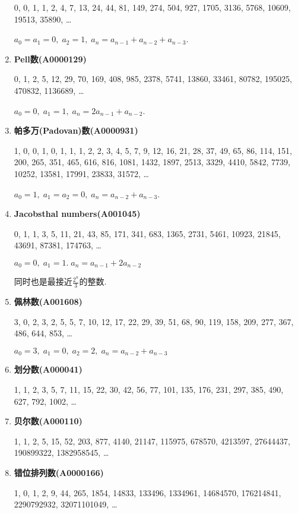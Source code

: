 \begin{enumerate}
0, 0, 1, 1, 2, 4, 7, 13, 24, 44, 81, 149, 274, 504, 927, 1705, 3136, 5768, 10609, 19513, 35890, \dots

$ a_0 = a_1 = 0,\; a_2 = 1,\; a_n = a_{n - 1} + a_{n - 2} + a_{n - 3} $.

\item \textbf{Pell数(A0000129)}

0, 1, 2, 5, 12, 29, 70, 169, 408, 985, 2378, 5741, 13860, 33461, 80782, 195025, 470832, 1136689, \dots

$ a_0 = 0,\; a_1 = 1,\; a_n = 2a_{n - 1} + a_{n - 2} $.

\item \textbf{帕多万(Padovan)数(A0000931)}

1, 0, 0, 1, 0, 1, 1, 1, 2, 2, 3, 4, 5, 7, 9, 12, 16, 21, 28, 37, 49, 65, 86, 114, 151, 200, 265, 351, 465, 616, 816, 1081, 1432, 1897, 2513, 3329, 4410, 5842, 7739, 10252, 13581, 17991, 23833, 31572, \dots

$a_0 = 1,\; a_1 = a_2 = 0,\; a_n = a_{n - 2} + a_{n - 3}$.

\item \textbf{Jacobsthal numbers(A001045)}

0, 1, 1, 3, 5, 11, 21, 43, 85, 171, 341, 683, 1365, 2731, 5461, 10923, 21845, 43691, 87381, 174763, \dots

$ a_0 = 0,\; a_1 = 1.\; a_n = a_{n - 1} + 2a_{n - 2} $

同时也是最接近$\frac {2 ^ n} 3$的整数.

\item \textbf{佩林数(A001608)}

3, 0, 2, 3, 2, 5, 5, 7, 10, 12, 17, 22, 29, 39, 51, 68, 90, 119, 158, 209, 277, 367, 486, 644, 853, \dots

$ a_0 = 3,\; a_1 = 0,\; a_2 = 2,\; a_n = a_{n - 2} + a_{n - 3} $

\item \textbf{划分数(A000041)}

1, 1, 2, 3, 5, 7, 11, 15, 22, 30, 42, 56, 77, 101, 135, 176, 231, 297, 385, 490, 627, 792, 1002, \dots

\item \textbf{贝尔数(A000110)}

1, 1, 2, 5, 15, 52, 203, 877, 4140, 21147, 115975, 678570, 4213597, 27644437, 190899322, 1382958545, \dots

\item \textbf{错位排列数(A0000166)}

1, 0, 1, 2, 9, 44, 265, 1854, 14833, 133496, 1334961, 14684570, 176214841, 2290792932, 32071101049, \dots


\end{enumerate}
